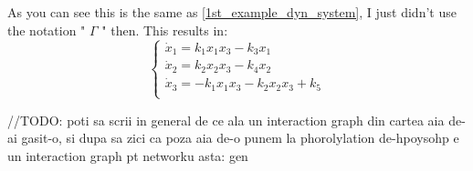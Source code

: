 As you can see this is the same as \ref{1st_example_dyn_system}, I just didn't use the notation " $\Gamma$ " then. This results in:
\[
	\begin{cases*}
		\dot{x}_1 = k_1 x_1 x_3 - k_3x_1  \\
		\dot{x}_2 = k_2 x_2 x_3 - k_4 x_2  \\
		\dot{x}_3 = -k_1 x_1 x_3 - k_2 x_2 x_3 + k_5 \\
	\end{cases*}
\]

\hfill\break
//TODO: poti sa scrii in general de ce ala un interaction graph din cartea aia de-ai gasit-o, si dupa sa zici ca poza aia de-o punem la phorolylation de-hpoysohp e un interaction graph pt networku asta: gen
\hfill\break